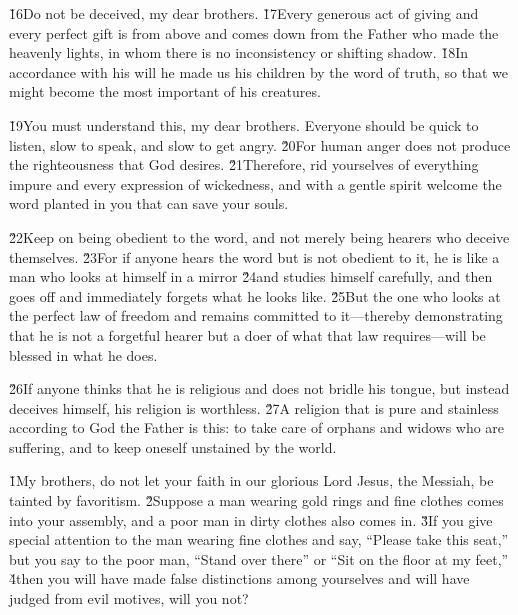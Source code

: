\v{16}Do not be deceived, my dear brothers. \v{17}Every generous act of giving and every perfect gift is from above and comes down from the Father who made the heavenly lights, in whom there is no inconsistency or shifting shadow. \v{18}In accordance with his will he made us his children by the word of truth, so that we might become the most important of his creatures.

\v{19}You must understand this, my dear brothers. Everyone should be quick to listen, slow to speak, and slow to get angry. \v{20}For human anger does not produce the righteousness that God desires. \v{21}Therefore, rid yourselves of everything impure and every expression of wickedness, and with a gentle spirit welcome the word planted in you that can save your souls.

\v{22}Keep on being obedient to the word, and not merely being hearers who deceive themselves. \v{23}For if anyone hears the word but is not obedient to it, he is like a man who looks at himself in a mirror \v{24}and studies himself carefully, and then goes off and immediately forgets what he looks like. \v{25}But the one who looks at the perfect law of freedom and remains committed to it---thereby demonstrating that he is not a forgetful hearer but a doer of what that law requires---will be blessed in what he does.

\v{26}If anyone thinks that he is religious and does not bridle his tongue, but instead deceives himself, his religion is worthless. \v{27}A religion that is pure and stainless according to God the Father is this: to take care of orphans and widows who are suffering, and to keep oneself unstained by the world.

\v{1}My brothers, do not let your faith in our glorious Lord Jesus, the Messiah, be tainted by favoritism. \v{2}Suppose a man wearing gold rings and fine clothes comes into your assembly, and a poor man in dirty clothes also comes in. \v{3}If you give special attention to the man wearing fine clothes and say, ``Please take this seat,'' but you say to the poor man, ``Stand over there'' or ``Sit on the floor at my feet,'' \v{4}then you will have made false distinctions among yourselves and will have judged from evil motives, will you not?


